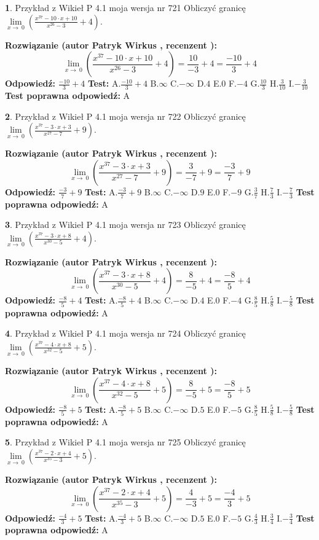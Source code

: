 \documentclass[12pt, a4paper]{article}
\theoremstyle{definition} %
\newtheorem{zad}{}
\newcommand{\zadStart}[1]{\begin{zad}#1\newline}
\newcommand{\zadStop}{\end{zad}}
\newcommand{\rozwStart}[2]{\noindent \textbf{Rozwiązanie (autor #1 , recenzent #2): }\newline}
\newcommand{\rozwStop}{\newline}
\newcommand{\odpStart}{\noindent \textbf{Odpowiedź:}\newline}
\newcommand{\odpStop}{\newline}
\newcommand{\testStart}{\noindent \textbf{Test:}\newline}
\newcommand{\testStop}{\newline}
\newcommand{\kluczStart}{\noindent \textbf{Test poprawna odpowiedź:}\newline}
\newcommand{\kluczStop}{\newline}
\begin{document}
\zadStart{Przykład z Wikieł P 4.1 moja wersja nr 721}
Obliczyć granicę $\lim\limits_{x\to\ 0}(\frac{x^{37}-10 \cdot x +10}{x^{26}-3}+4)$.
\zadStop
\rozwStart{Patryk Wirkus}{}
$$\lim\limits_{x\to\ 0}(\frac{x^{37}-10 \cdot x +10}{x^{26}-3}+4)=\frac{10}{-3}+4=\frac{-10}{3}+4$$
\rozwStop
\odpStart
$\frac{-10}{3}+4$
\odpStop
\testStart
A.$\frac{-10}{3}+4$
B.$\infty$
C.$-\infty$
D.$4$
E.$0$
F.$-4$
G.$\frac{10}{3}$
H.$\frac{3}{10}$
I.$-\frac{3}{10}$
\testStop
\kluczStart
A
\kluczStop



\zadStart{Przykład z Wikieł P 4.1 moja wersja nr 722}
Obliczyć granicę $\lim\limits_{x\to\ 0}(\frac{x^{37}-3 \cdot x +3}{x^{27}-7}+9)$.
\zadStop
\rozwStart{Patryk Wirkus}{}
$$\lim\limits_{x\to\ 0}(\frac{x^{37}-3 \cdot x +3}{x^{27}-7}+9)=\frac{3}{-7}+9=\frac{-3}{7}+9$$
\rozwStop
\odpStart
$\frac{-3}{7}+9$
\odpStop
\testStart
A.$\frac{-3}{7}+9$
B.$\infty$
C.$-\infty$
D.$9$
E.$0$
F.$-9$
G.$\frac{3}{7}$
H.$\frac{7}{3}$
I.$-\frac{7}{3}$
\testStop
\kluczStart
A
\kluczStop



\zadStart{Przykład z Wikieł P 4.1 moja wersja nr 723}
Obliczyć granicę $\lim\limits_{x\to\ 0}(\frac{x^{37}-3 \cdot x +8}{x^{30}-5}+4)$.
\zadStop
\rozwStart{Patryk Wirkus}{}
$$\lim\limits_{x\to\ 0}(\frac{x^{37}-3 \cdot x +8}{x^{30}-5}+4)=\frac{8}{-5}+4=\frac{-8}{5}+4$$
\rozwStop
\odpStart
$\frac{-8}{5}+4$
\odpStop
\testStart
A.$\frac{-8}{5}+4$
B.$\infty$
C.$-\infty$
D.$4$
E.$0$
F.$-4$
G.$\frac{8}{5}$
H.$\frac{5}{8}$
I.$-\frac{5}{8}$
\testStop
\kluczStart
A
\kluczStop



\zadStart{Przykład z Wikieł P 4.1 moja wersja nr 724}
Obliczyć granicę $\lim\limits_{x\to\ 0}(\frac{x^{37}-4 \cdot x +8}{x^{32}-5}+5)$.
\zadStop
\rozwStart{Patryk Wirkus}{}
$$\lim\limits_{x\to\ 0}(\frac{x^{37}-4 \cdot x +8}{x^{32}-5}+5)=\frac{8}{-5}+5=\frac{-8}{5}+5$$
\rozwStop
\odpStart
$\frac{-8}{5}+5$
\odpStop
\testStart
A.$\frac{-8}{5}+5$
B.$\infty$
C.$-\infty$
D.$5$
E.$0$
F.$-5$
G.$\frac{8}{5}$
H.$\frac{5}{8}$
I.$-\frac{5}{8}$
\testStop
\kluczStart
A
\kluczStop



\zadStart{Przykład z Wikieł P 4.1 moja wersja nr 725}
Obliczyć granicę $\lim\limits_{x\to\ 0}(\frac{x^{37}-2 \cdot x +4}{x^{35}-3}+5)$.
\zadStop
\rozwStart{Patryk Wirkus}{}
$$\lim\limits_{x\to\ 0}(\frac{x^{37}-2 \cdot x +4}{x^{35}-3}+5)=\frac{4}{-3}+5=\frac{-4}{3}+5$$
\rozwStop
\odpStart
$\frac{-4}{3}+5$
\odpStop
\testStart
A.$\frac{-4}{3}+5$
B.$\infty$
C.$-\infty$
D.$5$
E.$0$
F.$-5$
G.$\frac{4}{3}$
H.$\frac{3}{4}$
I.$-\frac{3}{4}$
\testStop
\kluczStart
A
\kluczStop
\end{document}
